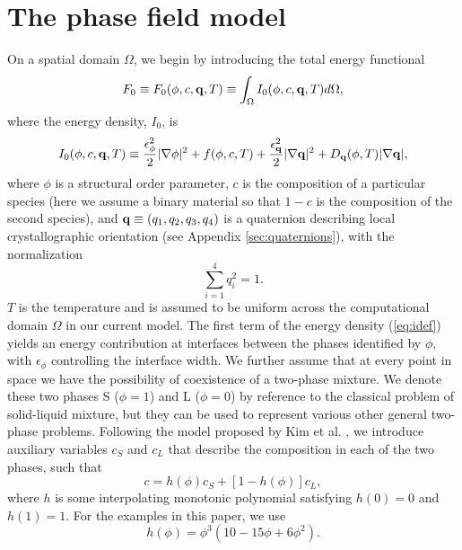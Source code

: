 \chapter{The phase field model}
\label{sec:model}

On a spatial domain $\Omega$, we begin by introducing the total energy functional
%
\begin{equation}
  F_0 \equiv F_0(\phi,c,{\bf q},T)
    \equiv \int_{\Omega} I_0(\phi,c,{\bf q},T) d\Omega,
\label{eq:fdef}
\end{equation}
%
where the energy density, $I_0$, is
%
\begin{equation}
  I_0(\phi,c,{\bf q},T) \equiv
    \frac{\epsilon_{\phi}^2}{2} |\nabla \phi |^2 + f(\phi,c,T) +
    \frac{\epsilon_{\bf q}^2}{2} |\nabla {\bf q} |^2 +
    D_{\bf q}(\phi,T) |\nabla {\bf q} |,
\label{eq:idef}
\end{equation}
%
where $\phi$ is a structural order parameter, $c$ is the composition
of a particular species (here we assume a binary material so that $1-c$ is
the composition of the second species), and ${\bf q} \equiv
(q_1,q_2,q_3,q_4)$ is a quaternion describing local crystallographic
orientation (see Appendix \ref{sec:quaternions}), with the
normalization
%
\begin{equation}
  \sum_{i=1}^4 q_i^2 = 1.
\label{eq:constraint}
\end{equation}
%
$T$ is the temperature and is assumed to be uniform across the
computational domain $\Omega$ in our current model.  The first term of the
energy density (\ref{eq:idef}) yields an energy contribution at
interfaces between the phases identified by $\phi$, with
$\epsilon_{\phi}$ controlling the interface width.  We further assume
that at every point in space we have the possibility of coexistence of
a two-phase mixture.  We denote these two phases S ($\phi=1$) and L
($\phi=0$) by reference to the classical problem of solid-liquid
mixture, but they can be used to represent various other general two-phase problems.  Following the model proposed by Kim et
al. \cite{PhysRevE.60.7186}, we introduce auxiliary variables $c_S$
and $c_L$ that describe the composition in each of the two phases,
such that
%
\begin{equation}
  c=h(\phi)c_S+[1-h(\phi)]c_L,
\label{eq:cmix}
\end{equation}
%
where $h$ is some interpolating monotonic polynomial satisfying
$h(0)=0$ and $h(1)=1$.  For the examples in this paper, we use
%
\begin{equation}
  h(\phi) = \phi^3 \left( 10 - 15 \phi + 6 \phi^2 \right).
\end{equation}
